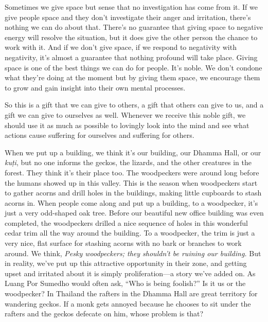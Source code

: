 Sometimes we give space but sense that no investigation has come from 
it. If we give people space and they don't investigate their anger and 
irritation, there's nothing we can do about that. There's no guarantee 
that giving space to negative energy will resolve the situation, but it 
does give the other person the chance to work with it. And if we don't 
give space, if we respond to negativity with negativity, it's almost a 
guarantee that nothing profound will take place. Giving space is one of 
the best things we can do for people. It's noble. We don't condone what 
they're doing at the moment but by giving them space, we encourage them 
to grow and gain insight into their own mental processes.

So this is a gift that we can give to others, a gift that others can 
give to us, and a gift we can give to ourselves as well. Whenever we 
receive this noble gift, we should use it as much as possible to 
lovingly look into the mind and see what actions cause suffering for 
ourselves and suffering for others.


When we put up a building, we think it's our building, our Dhamma Hall, 
or our \emph{kuṭi}, but no one informs the geckos, the lizards, and 
the other creatures in the forest. They think it's their place too. The 
woodpeckers were around long before the humans showed up in this 
valley. This is the season when woodpeckers start to gather acorns and 
drill holes in the buildings, making little cupboards to stash acorns 
in. When people come along and put up a building, to a woodpecker, it's 
just a very odd-shaped oak tree. Before our beautiful new office 
building was even completed, the woodpeckers drilled a nice sequence of 
holes in this wonderful cedar trim all the way around the building. To 
a woodpecker, the trim is just a very nice, flat surface for stashing 
acorns with no bark or branches to work around. We think, \emph{Pesky 
woodpeckers; they shouldn't be ruining our building.} But in reality, 
we've put up this attractive opportunity in their zone, and getting 
upset and irritated about it is simply proliferation---a story we've 
added on. As Luang Por Sumedho would often ask, ``Who is being 
foolish?'' Is it us or the woodpecker? In Thailand the rafters in the 
Dhamma Hall are great territory for wandering geckos. If a monk gets 
annoyed because he chooses to sit under the rafters and the geckos 
defecate on him, whose problem is that?

